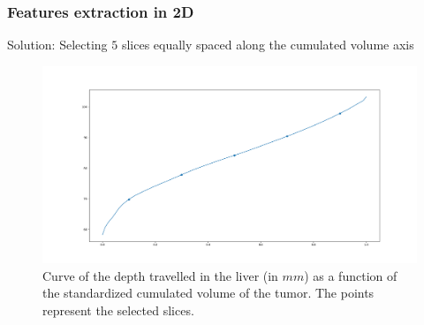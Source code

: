 \documentclass{beamer}
\begin{document}
\begin{frame}
    \frametitle{Features extraction in 2D}
    Solution: Selecting $5$ slices equally spaced along the cumulated volume axis
    \begin{figure}
        \centering
        \includegraphics[scale = 0.15]{images/curve_points.png}
        \caption{Curve of the depth travelled in the liver  (in $mm$) as a function of the standardized cumulated volume of the tumor. The points represent the selected slices.}
    \end{figure}
\end{frame}
\end{document}
